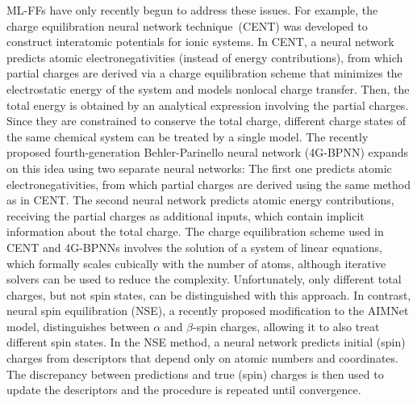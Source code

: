 \documentclass[%
superscriptaddress,
reprint,
nofootinbib,
amsmath,amssymb,amsfonts,
floatfix,
altaffilletter,
showkeys,
]{revtex4-2}
\begin{document}
ML-FFs have only recently begun to address these issues. For example, the charge equilibration neural network technique~(CENT)\cite{ghasemi2015interatomic} was developed to construct interatomic potentials for ionic systems. In CENT, a neural network predicts atomic electronegativities (instead of energy contributions), from which partial charges are derived via a charge equilibration scheme\cite{rappe1991charge,wilmer2012extended,cheng2014charge} that minimizes the electrostatic energy of the system and models nonlocal charge transfer. Then, the total energy is obtained by an analytical expression involving the partial charges. Since they are constrained to conserve the total charge, different charge states of the same chemical system can be treated by a single model. The recently proposed fourth-generation Behler-Parinello neural network (4G-BPNN)\cite{ko2021fourth} expands on this idea using two separate neural networks: The first one predicts atomic electronegativities, from which partial charges are derived using the same method as in CENT. The second neural network predicts atomic energy contributions, receiving the partial charges as additional inputs, which contain implicit information about the total charge. The charge equilibration scheme used in CENT and 4G-BPNNs involves the solution of a system of linear equations, which formally scales cubically with the number of atoms, although iterative solvers can be used to reduce the complexity.\cite{ko2021fourth} Unfortunately, only different total charges, but not spin states, can be distinguished with this approach. In contrast, neural spin equilibration (NSE),\cite{zubatyuk2020teaching} a recently proposed modification to the AIMNet model,\cite{zubatyuk2019accurate} distinguishes between $\alpha$ and $\beta$-spin charges, allowing it to also treat different spin states. In the NSE method, a neural network predicts initial (spin) charges from descriptors that depend only on atomic numbers and coordinates. The discrepancy between predictions and true (spin) charges is then used to update the descriptors and the procedure is repeated until convergence.
\end{document}
